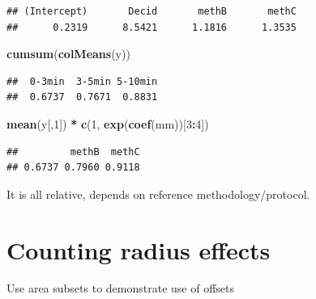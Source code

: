 \documentclass[12pt,]{book}
\newenvironment{Shaded}{\begin{snugshade}}{\end{snugshade}}
\newcommand{\CommentTok}[1]{\textcolor[rgb]{0.56,0.35,0.01}{\textit{#1}}}
\newcommand{\DecValTok}[1]{\textcolor[rgb]{0.00,0.00,0.81}{#1}}
\newcommand{\KeywordTok}[1]{\textcolor[rgb]{0.13,0.29,0.53}{\textbf{#1}}}
\newcommand{\NormalTok}[1]{#1}
\newcommand{\OperatorTok}[1]{\textcolor[rgb]{0.81,0.36,0.00}{\textbf{#1}}}
\newcommand{\StringTok}[1]{\textcolor[rgb]{0.31,0.60,0.02}{#1}}
\begin{document}
\begin{verbatim}
## (Intercept)       Decid       methB       methC 
##      0.2319      8.5421      1.1816      1.3535
\end{verbatim}

\begin{Shaded}
\begin{Highlighting}[]
\KeywordTok{cumsum}\NormalTok{(}\KeywordTok{colMeans}\NormalTok{(y))}
\end{Highlighting}
\end{Shaded}

\begin{verbatim}
##  0-3min  3-5min 5-10min 
##  0.6737  0.7671  0.8831
\end{verbatim}

\begin{Shaded}
\begin{Highlighting}[]
\KeywordTok{mean}\NormalTok{(y[,}\DecValTok{1}\NormalTok{]) }\OperatorTok{*}\StringTok{ }\KeywordTok{c}\NormalTok{(}\DecValTok{1}\NormalTok{, }\KeywordTok{exp}\NormalTok{(}\KeywordTok{coef}\NormalTok{(mm))[}\DecValTok{3}\OperatorTok{:}\DecValTok{4}\NormalTok{])}
\end{Highlighting}
\end{Shaded}

\begin{verbatim}
##         methB  methC 
## 0.6737 0.7960 0.9118
\end{verbatim}

It is all relative, depends on reference methodology/protocol.

\hypertarget{counting-radius-effects}{%
\section{Counting radius effects}\label{counting-radius-effects}}

Use area subsets to demonstrate use of offsets

\begin{Shaded}
\end{Shaded}
\end{document}
